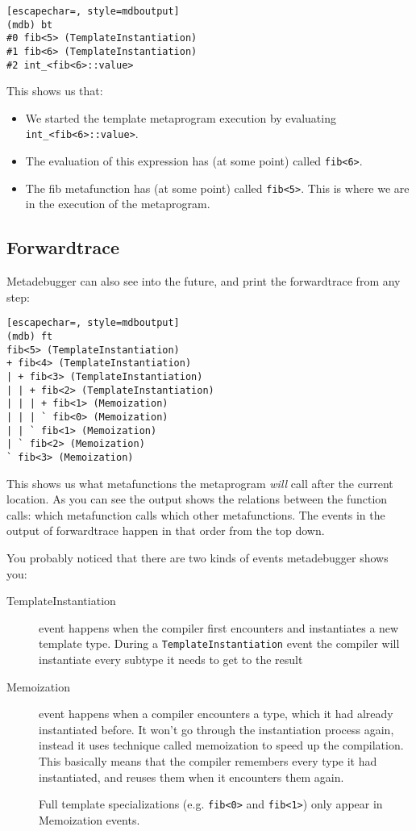 \begin{lstlisting}[escapechar=, style=mdboutput]
(mdb) bt
#0 fib<5> (TemplateInstantiation)
#1 fib<6> (TemplateInstantiation)
#2 int_<fib<6>::value>
\end{lstlisting}

This shows us that:

\begin{itemize}
    \item
        We started the template metaprogram execution by evaluating
        \texttt{int\_<fib<6>::value>}.
    \item
        The evaluation of this expression has (at some point) called
        \texttt{fib<6>}.
    \item
        The fib metafunction has (at some point) called \texttt{fib<5>}.
        This is where we are in the execution of the metaprogram.
\end{itemize}

\subsection{Forwardtrace}

Metadebugger can also see into the future, and print the forwardtrace from any
step:

\begin{lstlisting}[escapechar=, style=mdboutput]
(mdb) ft
fib<5> (TemplateInstantiation)
+ fib<4> (TemplateInstantiation)
| + fib<3> (TemplateInstantiation)
| | + fib<2> (TemplateInstantiation)
| | | + fib<1> (Memoization)
| | | ` fib<0> (Memoization)
| | ` fib<1> (Memoization)
| ` fib<2> (Memoization)
` fib<3> (Memoization)
\end{lstlisting}

This shows us what metafunctions the metaprogram \textit{will} call after the
current location. As you can see the output shows the relations between the
function calls: which metafunction calls which other metafunctions. The events
in the output of forwardtrace happen in that order from the top down.

You probably noticed that there are two kinds of events metadebugger shows you:

\begin{description}
    \item[TemplateInstantiation] event happens when the compiler first
        encounters and instantiates a new template type. During a
        \texttt{TemplateInstantiation} event the compiler will instantiate
        every subtype it needs to get to the result
    \item[Memoization] event happens when a compiler encounters a type, which
        it had already instantiated before. It won't go through the
        instantiation process again, instead it uses technique called
        memoization to speed up the compilation. This basically means that the
        compiler remembers every type it had instantiated, and reuses them when
        it encounters them again.

        Full template specializations (e.g. \texttt{fib<0>} and
        \texttt{fib<1>}) only appear in Memoization events.
\end{description}

